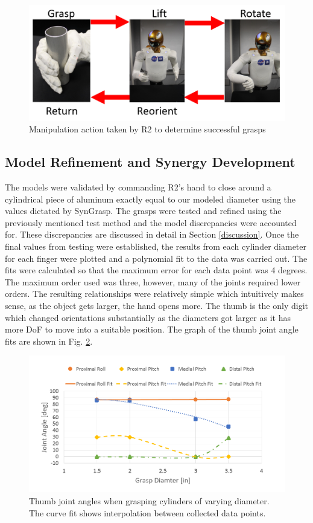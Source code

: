 \documentclass[runningheads,a4paper]{llncs}
\begin{document}
\begin{figure}[]
  \centering
  \includegraphics[width=\linewidth]{manipulation}
  \caption{Manipulation action taken by R2 to determine successful grasps}
  \label{testing}
\end{figure}

\subsection{Model Refinement and Synergy Development}
The models were validated by commanding R2's hand to close around a cylindrical piece of aluminum exactly equal to our modeled diameter using the values dictated by SynGrasp. The grasps were tested and refined using the previously mentioned test method and the model discrepancies were accounted for. These discrepancies are discussed in detail in Section \ref{discussion}. Once the final values from testing were established, the results from each cylinder diameter for each finger were plotted and a polynomial fit to the data was carried out. The fits were calculated so that the maximum error for each data point was 4 degrees.   The maximum order used was three, however, many of the joints required lower orders. The resulting relationships were relatively simple which intuitively makes sense, as the object gets larger, the hand opens more. The thumb is the only digit which changed orientations substantially as the diameters got larger as it has more DoF to move into a suitable position. The graph of the thumb joint angle fits are shown in Fig. \ref{thumb_fits}.

\begin{figure}[!b]
  \centering
  \includegraphics[width=1.08\linewidth]{Thumb_Fits_2}
  \caption{Thumb joint angles when grasping cylinders of varying diameter.  The curve fit shows interpolation between collected data points.}
  \label{thumb_fits} 
\end{figure}
\end{document}
